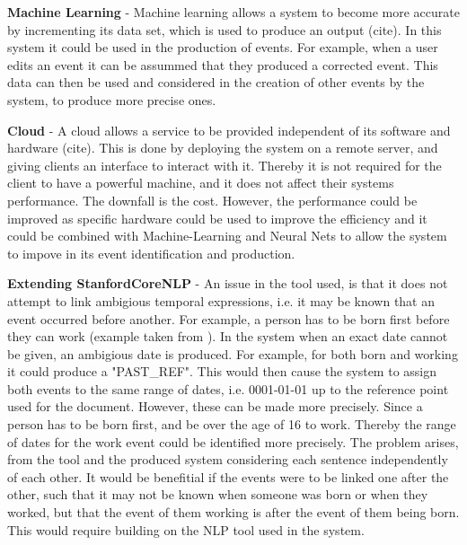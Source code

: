 \par \textbf{Machine Learning} - Machine learning allows a system to become more accurate by incrementing its data set, which is used to produce an output (cite). In this system it could be used in the production of events. For example, when a user edits an event it can be assummed that they produced a corrected event. This data can then be used and considered in the creation of other events by the system, to produce more precise ones.

\par \textbf{Cloud} - A cloud allows a service to be provided independent of its software and hardware (cite). This is done by deploying the system on a remote server, and giving clients an interface to interact with it. Thereby it is not required for the client to have a powerful machine, and it does not affect their systems performance. The downfall is the cost. However, the performance could be improved as specific hardware could be used to improve the efficiency and it could be combined with Machine-Learning and Neural Nets to allow the system to impove in its event identification and production.

\par \textbf{Extending StanfordCoreNLP} - An issue in the tool used, is that it does not attempt to link ambigious temporal expressions, i.e. it may be known that an event occurred before another. For example, a person has to be born first before they can work (example taken from \cite{mccloskymanning2012}). In the system when an exact date cannot be given, an ambigious date is produced. For example, for both born and working it could produce a "PAST\_REF". This would then cause the system to assign both events to the same range of dates, i.e. 0001-01-01 up to the reference point used for the document. However, these can be made more precisely.  Since a person has to be born first, and be over the age of 16 to work. Thereby the range of dates for the work event could be identified more precisely. The problem arises, from the tool and the produced system considering each sentence independently of each other. It would be benefitial if the events were to be linked one after the other, such that it may not be known when someone was born or when they worked, but that the event of them working is after the event of them being born. This would require building on the NLP tool used in the system.